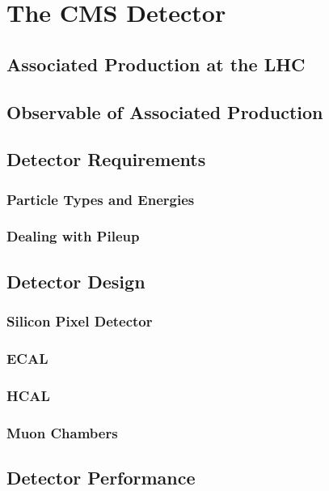 \chapter{The CMS Detector}

\section{Associated Production at the LHC}


\section{Observable of Associated Production}


\section{Detector Requirements}

\subsection{Particle Types and Energies}

\subsection{Dealing with Pileup}

\section{Detector Design}

\subsection{Silicon Pixel Detector}

\subsection{ECAL}

\subsection{HCAL}

\subsection{Muon Chambers}

\section{Detector Performance}
